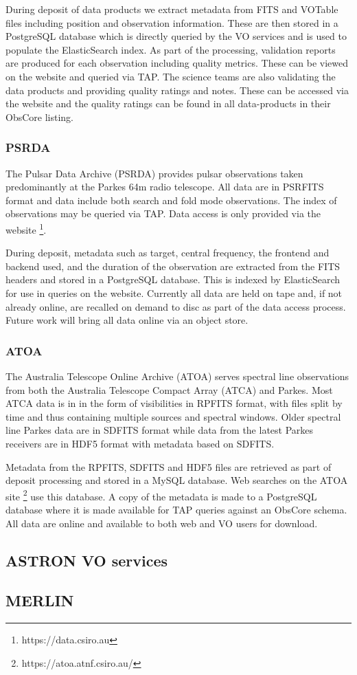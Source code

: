 \documentclass[11pt,a4paper]{ivoa}
\begin{document}
During deposit of data products we extract metadata from FITS and VOTable files including position and observation information.
These are then stored in a PostgreSQL database which is directly queried by the VO services and is used to populate the ElasticSearch index.
As part of the processing, validation reports are produced for each observation including quality metrics.
These can be viewed on the website and queried via TAP.
The science teams are also validating the data products and providing quality ratings and notes.
These can be accessed via the website and the quality ratings can be found in all data-products in their ObsCore listing.

\subsubsection{PSRDA}

The Pulsar Data Archive (PSRDA) provides pulsar observations taken predominantly at the Parkes 64m radio telescope.
All data are in PSRFITS format and data include both search and fold mode observations.
The index of observations may be queried via TAP. Data access is only provided via the website \footnote{https://data.csiro.au}.

During deposit, metadata such as target, central frequency, the frontend and backend used, and the duration of the observation are extracted from the FITS headers and stored in a PostgreSQL database.
This is indexed by ElasticSearch for use in queries on the website.
Currently all data are held on tape and, if not already online, are recalled on demand to disc as part of the data access process.
Future work will bring all data online via an object store.

\subsubsection{ATOA}

The Australia Telescope Online Archive (ATOA) serves spectral line observations from both the Australia Telescope Compact Array (ATCA) and Parkes.
Most ATCA data is in in the form of visibilities in RPFITS format, with files split by time and thus containing multiple sources and spectral windows.
Older spectral line Parkes data are in SDFITS format while data from the latest Parkes receivers are in HDF5 format with metadata based on SDFITS.

Metadata from the RPFITS, SDFITS and HDF5 files are retrieved as part of deposit processing and stored in a MySQL database. Web searches on the ATOA site \footnote{https://atoa.atnf.csiro.au/} use this database.
A copy of the metadata is made to a PostgreSQL database where it is made available for TAP queries against an ObsCore schema. 
All data are online and available to both web and VO users for download.

\subsection{ASTRON VO services}\label{sec:Astron}

\subsection{MERLIN}\label{sec:MERLIN}

\end{document}
